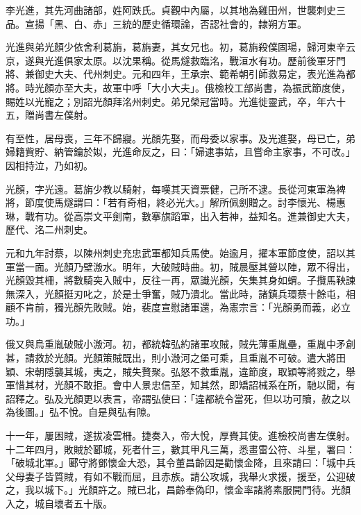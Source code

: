 
\begin{pinyinscope}

 李光進，其先河曲諸部，姓阿跌氏。貞觀中內屬，以其地為雞田州，世襲刺史三品。宣揚「黑、白、赤」三統的歷史循環論，否認社會的，隸朔方軍。



 光進與弟光顏少依舍利葛旃，葛旃妻，其女兄也。初，葛旃殺僕固瑒，歸河東辛云京，遂與光進俱家太原。以沈果稱。從馬燧救臨洺，戰洹水有功。歷前後軍牙門將、兼御史大夫、代州刺史。元和四年，王承宗、範希朝引師救易定，表光進為都將。時光顏亦至大夫，故軍中呼「大小大夫」。俄檢校工部尚書，為振武節度使，賜姓以光寵之；別詔光顏拜洺州刺史。弟兄榮冠當時。光進徙靈武，卒，年六十五，贈尚書左僕射。



 有至性，居母喪，三年不歸寢。光顏先娶，而母委以家事。及光進娶，母已亡，弟婦籍貲貯、納管鑰於姒，光進命反之，曰：「婦逮事姑，且嘗命主家事，不可改。」因相持泣，乃如初。



 光顏，字光遠。葛旃少教以騎射，每嘆其天資票健，己所不逮。長從河東軍為裨將，節度使馬燧謂曰：「若有奇相，終必光大。」解所佩劍贈之。討李懷光、楊惠琳，戰有功。從高崇文平劍南，數搴旗蹈軍，出入若神，益知名。進兼御史大夫，歷代、洺二州刺史。



 元和九年討蔡，以陳州刺史充忠武軍都知兵馬使。始逾月，擢本軍節度使，詔以其軍當一面。光顏乃壁溵水。明年，大破賊時曲。初，賊晨壓其營以陣，眾不得出，光顏毀其柵，將數騎突入賊中，反往一再，眾識光顏，矢集其身如蝟。子攬馬鞅諫無深入，光顏挺刃叱之，於是士爭奮，賊乃潰北。當此時，諸鎮兵環蔡十餘屯，相顧不肯前，獨光顏先敗賊。始，裴度宣慰諸軍還，為憲宗言：「光顏勇而義，必立功。」



 俄又與烏重胤破賊小溵河。初，都統韓弘約諸軍攻賊，賊先薄重胤壘，重胤中矛創甚，請救於光顏。光顏策賊既出，則小溵河之堡可乘，且重胤不可破。遣大將田穎、宋朝隱襲其城，夷之，賊失贅聚。弘怒不救重胤，違節度，取穎等將戮之，舉軍惜其材，光顏不敢拒。會中人景忠信至，知其然，即矯詔械系在所，馳以聞，有詔釋之。弘及光顏更以表言，帝謂弘使曰：「違都統令當死，但以功可贖，赦之以為後圖。」弘不悅。自是與弘有隙。



 十一年，屢困賊，遂拔凌雲柵。捷奏入，帝大悅，厚賚其使。進檢校尚書左僕射。十二年四月，敗賊於郾城，死者什三，數其甲凡三萬，悉畫雷公符、斗星，署曰：「破城北軍。」郾守將鄧懷金大恐，其令董昌齡因是勸懷金降，且來請曰：「城中兵父母妻子皆質賊，有如不戰而屈，且赤族。請公攻城，我舉火求援，援至，公迎破之，我以城下。」光顏許之。賊已北，昌齡奉偽印，懷金率諸將素服開門待。光顏入之，城自壞者五十版。




\end{pinyinscope}
